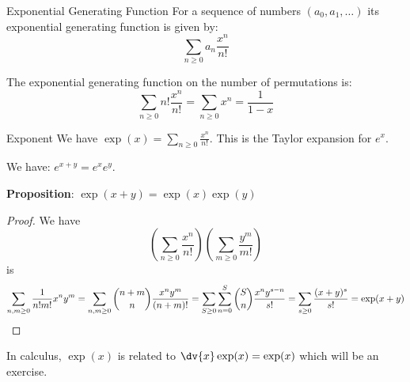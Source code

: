 \documentclass{report}
\begin{document}
\begin{definition}{Exponential Generating Function}
    For a sequence of numbers $(a_{0}, a_{1}, \ldots )$ its exponential generating function is given by:
        \begin{equation*}
            \sum_{n \geq 0} a_{n}\dfrac{x^{n}}{n!}
        \end{equation*}
\end{definition}

\begin{examples}
    \begin{example}
        The exponential generating function on the number of permutations is:
            \begin{equation*}
                \sum_{n \geq 0}n!\dfrac{x^{n}}{n!} = \sum_{n \geq 0}x^{n} = \dfrac{1}{1 - x}
            \end{equation*}
    \end{example}
\end{examples}

\begin{definition}{Exponent}
    We have $\mathop{exp}(x) = \sum_{n \geq 0}\frac{x^{n}}{n!}$. This is the Taylor expansion for $e^{x}$.
\end{definition}

We have: $e^{x + y} = e^{x}e^{y}$.

\textbf{Proposition}: $\exp(x + y) = \exp(x)\exp(y)$
    \begin{proof}
        We have
            \begin{equation*}
                \left(\sum_{n \geq 0}\dfrac{x^{n}}{n!}\right)\left(\sum_{m \geq 0}\dfrac{y^{m}}{m!}\right)
            \end{equation*}
        is
            \begin{equation*}
                \sum_{n, m \geq 0}\dfrac{1}{n!m!} x^{n}y^{m} = \sum_{n, m \geq 0}\dbinom{n + m}{n}\dfrac{x^{n}y^{m}}{(n + m)!} = \sum_{S \geq 0}\sum_{n = 0}^{S}\dbinom{S}{n}\dfrac{x^{n}y^{s - n}}{s!} = \sum_{s \geq 0}\dfrac{(x + y)^{s}}{s!} = \exp(x + y)
            \end{equation*}
    \end{proof}

In calculus, $\exp(x)$ is related to $\dv{x}\exp(x) = \exp(x)$ which will be an exercise.
\end{document}
